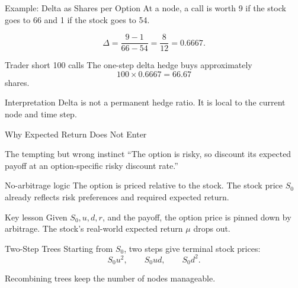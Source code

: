\documentclass[aspectratio=169,11pt]{beamer}
\begin{document}
\begin{frame}{Example: Delta as Shares per Option}
    At a node, a call is worth 9 if the stock goes to 66 and 1 if the stock goes to 54.

    \[
        \Delta=\frac{9-1}{66-54}=\frac{8}{12}=0.6667.
    \]

    \begin{exampleblock}{Trader short 100 calls}
        The one-step delta hedge buys approximately
        \[
            100\times 0.6667=66.67
        \]
        shares.
    \end{exampleblock}

    \begin{alertblock}{Interpretation}
        Delta is not a permanent hedge ratio. It is local to the current node and time step.
    \end{alertblock}
\end{frame}

\begin{frame}{Why Expected Return Does Not Enter}
    \begin{block}{The tempting but wrong instinct}
        ``The option is risky, so discount its expected payoff at an option-specific risky discount rate.''
    \end{block}

    \begin{block}{No-arbitrage logic}
        The option is priced relative to the stock.
        The stock price \(S_0\) already reflects risk preferences and required expected return.
    \end{block}

    \begin{alertblock}{Key lesson}
        Given \(S_0,u,d,r\), and the payoff, the option price is pinned down by arbitrage.
        The stock's real-world expected return \(\mu\) drops out.
    \end{alertblock}
\end{frame}

\begin{frame}{Two-Step Trees}
    Starting from \(S_0\), two steps give terminal stock prices:
    \[
        S_0u^2,\qquad S_0ud,\qquad S_0d^2.
    \]

    \begin{center}
    \end{center}

    Recombining trees keep the number of nodes manageable.
\end{frame}
\end{document}
